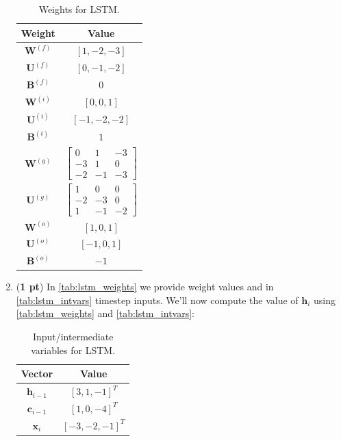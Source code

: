 \documentclass[11pt, letterpaper]{article}
\begin{document}
\begin{enumerate}[label=(\alph*)]

\begin{table}[h]
    \centering
    \begin{tabular}{|cc|}
    \toprule
    \textbf{Weight} & \textbf{Value} \\
    \midrule
    $\mathbf{W}^{(f)}$ & $[1,-2,-3]$ \\
    $\mathbf{U}^{(f)}$ & $[0,-1,-2]$ \\
    $\mathbf{B}^{(f)}$ & $0$ \\
    $\mathbf{W}^{(i)}$ & $[0,0,1]$\\
    $\mathbf{U}^{(i)}$ & $[-1,-2,-2]$\\
    $\mathbf{B}^{(i)}$ & $1$ \\
    $\mathbf{W}^{(g)}$ & $\begin{bmatrix}
    0 & 1 & -3\\
    -3 & 1 & 0\\
    -2 & -1 & -3
        \end{bmatrix}$ \\
    $\mathbf{U}^{(g)}$ & $\begin{bmatrix}
    1 & 0 & 0 \\
    -2 & -3 & 0\\
    1 & -1 & -2 \end{bmatrix}$ \\
    $\mathbf{W}^{(o)}$ & $[1,0,1]$\\
    $\mathbf{U}^{(o)}$ & $[-1,0,1]$\\
    $\mathbf{B}^{(o)}$ & $-1$ \\
    \bottomrule
    \end{tabular}
    \caption{Weights for LSTM.}
    \label{tab:lstm_weights}
\end{table}

\item (\textbf{1 pt}) In \autoref{tab:lstm_weights} we provide weight values and in \autoref{tab:lstm_intvars} timestep inputs. We'll now compute the value of $\boldsymbol{h}_{i}$ using \autoref{tab:lstm_weights} and \autoref{tab:lstm_intvars}: 

\begin{table}[h!]
    \centering
    \begin{tabular}{|cc|}
    \toprule
    \textbf{Vector} & \textbf{Value} \\
    \midrule
    $\boldsymbol{h}_{i-1}$ & $[3,1,-1]^T$ \\
    $\boldsymbol{c}_{i-1}$ & $[1,0,-4]^T$ \\
    $\boldsymbol{x}_{i}$ & $[-3,-2,-1]^T$ \\
    \bottomrule
    \end{tabular}
    \caption{Input/intermediate variables for LSTM.}
    \label{tab:lstm_intvars}
\end{table}



\end{enumerate}
\end{document}
